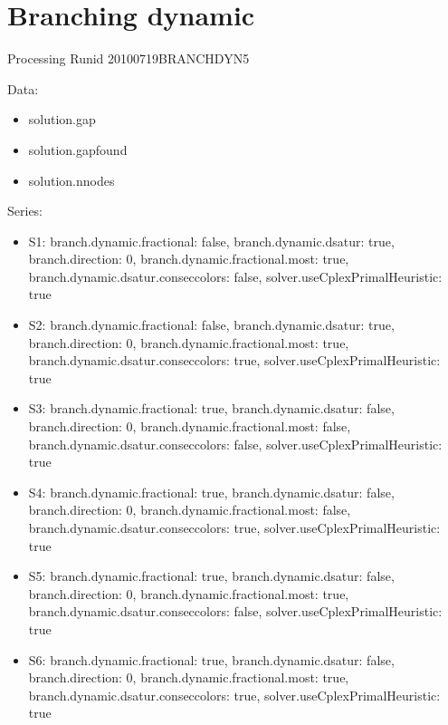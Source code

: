 \documentclass[landscape, 12pt]{report}
\begin{document}
	
	
	\clearpage
	
	\section{Branching dynamic}

Processing Runid 20100719BRANCHDYN5

Data:
\begin{itemize}
\item solution.gap
\item solution.gapfound
\item solution.nnodes
\end{itemize}
Series:
\begin{itemize}
\item S1: branch.dynamic.fractional: false, branch.dynamic.dsatur: true, branch.direction: 0, branch.dynamic.fractional.most: true, branch.dynamic.dsatur.conseccolors: false, solver.useCplexPrimalHeuristic: true
\item S2: branch.dynamic.fractional: false, branch.dynamic.dsatur: true, branch.direction: 0, branch.dynamic.fractional.most: true, branch.dynamic.dsatur.conseccolors: true, solver.useCplexPrimalHeuristic: true
\item S3: branch.dynamic.fractional: true, branch.dynamic.dsatur: false, branch.direction: 0, branch.dynamic.fractional.most: false, branch.dynamic.dsatur.conseccolors: false, solver.useCplexPrimalHeuristic: true
\item S4: branch.dynamic.fractional: true, branch.dynamic.dsatur: false, branch.direction: 0, branch.dynamic.fractional.most: false, branch.dynamic.dsatur.conseccolors: true, solver.useCplexPrimalHeuristic: true
\item S5: branch.dynamic.fractional: true, branch.dynamic.dsatur: false, branch.direction: 0, branch.dynamic.fractional.most: true, branch.dynamic.dsatur.conseccolors: false, solver.useCplexPrimalHeuristic: true
\item S6: branch.dynamic.fractional: true, branch.dynamic.dsatur: false, branch.direction: 0, branch.dynamic.fractional.most: true, branch.dynamic.dsatur.conseccolors: true, solver.useCplexPrimalHeuristic: true
\end{itemize}
\end{document}
